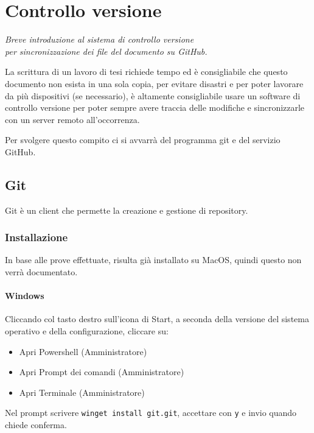 \documentclass[envcountsame,envcountchap]{svmono}
\begin{document}
\chapter{Controllo versione} \label{Cap.2}

\vspace{2cm}

\begin{flushright}
\textit{Breve introduzione al sistema di controllo versione\\ per sincronizzazione dei file del documento su GitHub.}
\end{flushright}

\vspace{0.5cm}

La scrittura di un lavoro di tesi richiede tempo ed è consigliabile che questo 
documento non esista in una sola copia, per evitare disastri e per poter lavorare 
da più dispositivi (se necessario), è altamente consigliabile usare un software
di controllo versione per poter sempre avere traccia delle modifiche e sincronizzarle
con un server remoto all'occorrenza.

Per svolgere questo compito ci si avvarrà del programma git e del servizio GitHub.

\section{Git}
Git è un client che permette la creazione e gestione di repository.
\subsection{Installazione \citep{installGit}}
In base alle prove effettuate, risulta già installato su MacOS, 
quindi questo non verrà documentato.
\subsubsection{Windows}
Cliccando col tasto destro sull'icona di Start, a seconda della versione del 
sistema operativo e della configurazione, cliccare su:
\begin{itemize}
    \item Apri Powershell (Amministratore)
    \item Apri Prompt dei comandi (Amministratore)
    \item Apri Terminale (Amministratore)
\end{itemize}
Nel prompt scrivere {\tt winget install git.git}, accettare con {\tt y} 
e invio quando chiede conferma.
\end{document}
